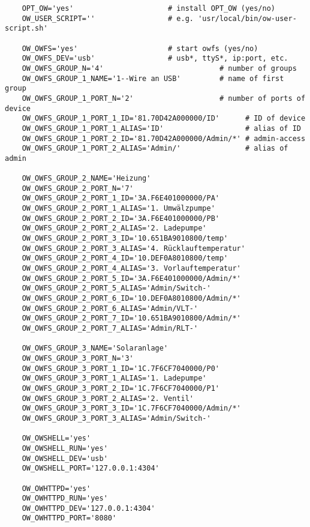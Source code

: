 \begin{example}
\begin{verbatim}
    OPT_OW='yes'                      # install OPT_OW (yes/no)
    OW_USER_SCRIPT=''                 # e.g. 'usr/local/bin/ow-user-script.sh'

    OW_OWFS='yes'                     # start owfs (yes/no)
    OW_OWFS_DEV='usb'                 # usb*, ttyS*, ip:port, etc.
    OW_OWFS_GROUP_N='4'                           # number of groups
    OW_OWFS_GROUP_1_NAME='1--Wire an USB'         # name of first group
    OW_OWFS_GROUP_1_PORT_N='2'                    # number of ports of device
    OW_OWFS_GROUP_1_PORT_1_ID='81.70D42A000000/ID'      # ID of device
    OW_OWFS_GROUP_1_PORT_1_ALIAS='ID'                   # alias of ID
    OW_OWFS_GROUP_1_PORT_2_ID='81.70D42A000000/Admin/*' # admin-access
    OW_OWFS_GROUP_1_PORT_2_ALIAS='Admin/'               # alias of admin

    OW_OWFS_GROUP_2_NAME='Heizung'
    OW_OWFS_GROUP_2_PORT_N='7'
    OW_OWFS_GROUP_2_PORT_1_ID='3A.F6E401000000/PA'
    OW_OWFS_GROUP_2_PORT_1_ALIAS='1. Umwälzpumpe'
    OW_OWFS_GROUP_2_PORT_2_ID='3A.F6E401000000/PB'
    OW_OWFS_GROUP_2_PORT_2_ALIAS='2. Ladepumpe'
    OW_OWFS_GROUP_2_PORT_3_ID='10.651BA9010800/temp'
    OW_OWFS_GROUP_2_PORT_3_ALIAS='4. Rücklauftemperatur'
    OW_OWFS_GROUP_2_PORT_4_ID='10.DEF0A8010800/temp'
    OW_OWFS_GROUP_2_PORT_4_ALIAS='3. Vorlauftemperatur'
    OW_OWFS_GROUP_2_PORT_5_ID='3A.F6E401000000/Admin/*'
    OW_OWFS_GROUP_2_PORT_5_ALIAS='Admin/Switch-'
    OW_OWFS_GROUP_2_PORT_6_ID='10.DEF0A8010800/Admin/*'
    OW_OWFS_GROUP_2_PORT_6_ALIAS='Admin/VLT-'
    OW_OWFS_GROUP_2_PORT_7_ID='10.651BA9010800/Admin/*'
    OW_OWFS_GROUP_2_PORT_7_ALIAS='Admin/RLT-'

    OW_OWFS_GROUP_3_NAME='Solaranlage'
    OW_OWFS_GROUP_3_PORT_N='3'
    OW_OWFS_GROUP_3_PORT_1_ID='1C.7F6CF7040000/P0'
    OW_OWFS_GROUP_3_PORT_1_ALIAS='1. Ladepumpe'
    OW_OWFS_GROUP_3_PORT_2_ID='1C.7F6CF7040000/P1'
    OW_OWFS_GROUP_3_PORT_2_ALIAS='2. Ventil'
    OW_OWFS_GROUP_3_PORT_3_ID='1C.7F6CF7040000/Admin/*'
    OW_OWFS_GROUP_3_PORT_3_ALIAS='Admin/Switch-'
	
	OW_OWSHELL='yes'
	OW_OWSHELL_RUN='yes'
	OW_OWSHELL_DEV='usb'
	OW_OWSHELL_PORT='127.0.0.1:4304'

	OW_OWHTTPD='yes'
	OW_OWHTTPD_RUN='yes'
	OW_OWHTTPD_DEV='127.0.0.1:4304'
	OW_OWHTTPD_PORT='8080'
\end{verbatim}
\end{example}

